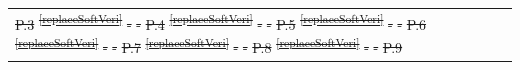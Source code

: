 \documentclass[a4paper,12pt,twoside]{article}
\providecommand{\DIFdeltex}[1]{{\protect\color{red}\sout{#1}}}                      %
\providecommand{\DIFdel}[1]{\texorpdfstring{\DIFdeltex{#1}}{}} %
\begin{document}
\begin{longtable}[]{|m{}| m{} |m{} |m{}|m{}|}
\DIFdel{P.3  }%
\DIFdel{\textsuperscript{\ref{replaceSoftVeri}}                                                           }%
\DIFdel{-        }%
\DIFdel{-        }%
\DIFdel{P.4  }%
\DIFdel{\textsuperscript{\ref{replaceSoftVeri}}                                                           }%
\DIFdel{-     }%
\DIFdel{-    }%
\DIFdel{P.5  }%
\DIFdel{\textsuperscript{\ref{replaceSoftVeri}}                                                                                        }%
\DIFdel{-        }%
\DIFdel{-            }%
\DIFdel{P.6  }%
\DIFdel{\textsuperscript{\ref{replaceSoftVeri}}                                                                          }%
\DIFdel{-    }%
\DIFdel{-            }%
\DIFdel{P.7  }%
\DIFdel{\textsuperscript{\ref{replaceSoftVeri}}                                                                         }%
\DIFdel{-     }%
\DIFdel{-           }%
\DIFdel{P.8  }%
\DIFdel{\textsuperscript{\ref{replaceSoftVeri}}                                                                          }%
\DIFdel{-       }%
\DIFdel{-            }%
\DIFdel{P.9  }%

\end{longtable}
\end{document}
